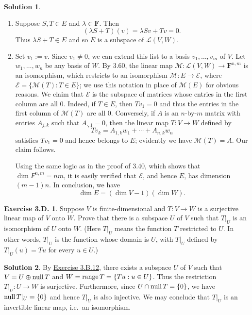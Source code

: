 \documentclass[12pt]{article}
\theoremstyle{definition}
\theoremstyle{exercise}
\newtheorem{exercise}{Exercise 3.D.}
\theoremstyle{solution}
\newtheorem*{solution}{Solution}
\newcommand{\lmap}{\mathcal{L}}
\newcommand{\mat}{\mathcal{M}}
\newcommand{\Null}{\text{null\,}}
\newcommand{\Range}{\text{range\,}}
\newcommand{\F}{\mathbf{F}}
\begin{document}
\begin{solution}
    \begin{enumerate}
        \item Suppose \( S, T \in E \) and \( \lambda \in \F \). Then
        \[
            (\lambda S + T)(v) = \lambda Sv + Tv = 0.
        \]
        Thus \( \lambda S + T \in E \) and so \( E \) is a subspace of \( \lmap(V, W) \).

        \item Set \( v_1 := v \). Since \( v_1 \neq 0 \), we can extend this list to a basis \( v_1, \ldots, v_m \) of \( V \). Let \( w_1, \ldots, w_n \) be any basis of \( W \). By 3.60, the linear map \( \mat : \lmap(V, W) \to \F^{n,m} \) is an isomorphism, which restricts to an isomorphism \( \mat : E \to \mathcal{E} \), where \( \mathcal{E} = \{ \mat(T) : T \in E \} \); we use this notation in place of \( \mat(E) \) for obvious reasons. We claim that \( \mathcal{E} \) is the subspace of matrices whose entries in the first column are all 0. Indeed, if \( T \in E \), then \( Tv_1 = 0 \) and thus the entries in the first column of \( \mat(T) \) are all 0. Conversely, if \( A \) is an \(n\)-by-\(m\) matrix with entries \( A_{j,k} \) such that \( A_{\cdot,1} = 0 \), then the linear map \( T : V \to W \) defined by
        \[
            T v_k = A_{1,k} w_1 + \cdots + A_{n,k} w_n
        \]
        satisfies \( Tv_1 = 0 \) and hence belongs to \( E \); evidently we have \( \mat(T) = A \). Our claim follows.

        Using the same logic as in the proof of 3.40, which shows that \( \dim F^{n,m} = nm \), it is easily verified that \( \mathcal{E} \), and hence \( E \), has dimension \( (m-1)n \). In conclusion, we have
        \[
            \dim E = (\dim V - 1)(\dim W).
        \]
    \end{enumerate}
\end{solution}

\begin{exercise}
\label{ex:8}
    Suppose \( V \) is finite-dimensional and \( T : V \to W \) is a surjective linear map of \( V \) onto \( W \). Prove that there is a subspace \( U \) of \( V \) such that \( T|_U \) is an isomorphism of \( U \) onto \( W \). (Here \( T|_U \) means the function \( T \) restricted to \( U \). In other words, \( T|_U \) is the function whose domain is \( U \), with \( T|_U \) defined by \( T|_U(u) = Tu \) for every \( u \in U \).)
\end{exercise}

\begin{solution}
    By \href{https://lew98.github.io/Mathematics/LADR_Section_3_B_Exercises.pdf}{Exercise 3.B.12}, there exists a subspace \( U \) of \( V \) such that \( V = U \oplus \Null T \) and \( W = \Range T = \{ Tu : u \in U \} \). Thus the restriction \( T|_U : U \to W \) is surjective. Furthermore, since \( U \cap \Null T = \{ 0 \} \), we have \( \Null T|_U = \{ 0 \} \) and hence \( T|_U \) is also injective. We may conclude that \( T|_U \) is an invertible linear map, i.e.\ an isomorphism.
\end{solution}
\end{document}
